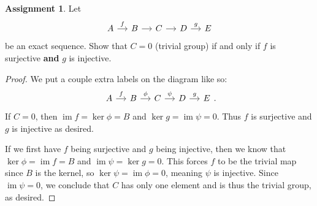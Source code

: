 \documentclass[12pt]{article}
\DeclareMathOperator{\im}{im}
\theoremstyle{definition}
\newtheorem{ex}{Assignment}
\begin{document}
\begin{ex}
	Let \begin{equation*}
		\begin{tikzcd}[column sep=small]
			A \arrow[r, "f"] & B \arrow[r] & C \arrow[r] & D \arrow[r, "g"] & E
		\end{tikzcd}
	\end{equation*}
	be an exact sequence.
	Show that $C = 0$ (trivial group) if and only if $f$ is surjective \textbf{and} $g$ is injective.
\end{ex}
\begin{proof}
	We put a couple extra labels on the diagram like so: \begin{equation*}
		\begin{tikzcd}[column sep=small]
			A \arrow[r, "f"] & B \arrow[r, "\phi"] & C \arrow[r, "\psi"] & D \arrow[r, "g"] & E
		\end{tikzcd}.
	\end{equation*}
	If $C = 0$, then $\im f = \ker \phi = B$ and $\ker g = \im \psi = 0$.
	Thus $f$ is surjective and $g$ is injective as desired.

	If we first have $f$ being surjective and $g$ being injective, then we know that $\ker\phi = \im f = B$ and $\im \psi = \ker g = 0$.
	This forces $f$ to be the trivial map since $B$ is the kernel, so $\ker\psi = \im\phi = 0$, meaning $\psi$ is injective.
	Since $\im \psi = 0$, we conclude that $C$ has only one element and is thus the trivial group, as desired.
\end{proof}
\end{document}
